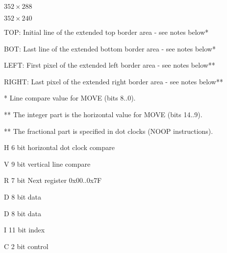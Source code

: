 \documentclass[11pt]{book}
\def\lthtmlcheckvsize{\ifdim\ht\sizebox<\vsize 
  \ifdim\wd\sizebox<\hsize\expandafter\hfill\fi \expandafter\vfill
  \else\expandafter\vss\fi}%
\begin{document}
{\newpage\clearpage
{}%
$352\times288$%
\lthtmlindisplaymathZ
\lthtmlcheckvsize\clearpage}

{\newpage\clearpage
{}%
$352\times240$%
\lthtmlindisplaymathZ
\lthtmlcheckvsize\clearpage}

{\newpage\clearpage
{}%
\begin{table}\centering
  
\end{table}%
\lthtmlfigureZ
\lthtmlcheckvsize\clearpage}

{\newpage\clearpage
{}%
\begin{table}\centering\small
  
\par
\raggedright TOP: Initial line of the extended top border area - see notes below*
\par
BOT: Last line of the extended bottom border area - see notes below*
\par
LEFT: First pixel of the extended left border area - see notes below**
\par
RIGHT: Last pixel of the extended right border area - see notes below**
\par
* Line compare value for MOVE (bits 8..0).
\par
** The integer part is the horizontal value for MOVE (bits 14..9).
\par
** The fractional part is specified in dot clocks (NOOP instructions).
\end{table}%
\lthtmlfigureZ
\lthtmlcheckvsize\clearpage}

{\newpage\clearpage
{}%
\begin{table}\centering
  
\par
\raggedright H   6 bit horizontal dot clock compare
\par
V   9 bit vertical line compare
\par
R   7 bit Next register 0x00..0x7F
\par
D   8 bit data
\end{table}%
\lthtmlfigureZ
\lthtmlcheckvsize\clearpage}

{\newpage\clearpage
{}%
\begin{table}\centering
  
\par
\raggedright D    8 bit data
\par
I   11 bit index 
\par
C   2 bit control
\end{table}%
\lthtmlfigureZ
\lthtmlcheckvsize\clearpage}
\end{document}
